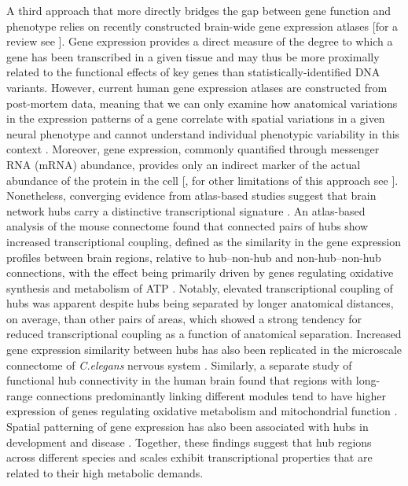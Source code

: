 A third approach that more directly bridges the gap between gene function and phenotype relies on recently constructed brain-wide gene expression atlases \citep{Hawrylycz2012} [for a review see \citep{Keil2018}]. Gene expression provides a direct measure of the degree to which a gene has been transcribed in a given tissue and may thus be more proximally related to the functional effects of key genes than statistically-identified DNA variants. However, current human gene expression atlases are constructed from post-mortem data, meaning that we can only examine how anatomical variations in the expression patterns of a gene correlate with spatial variations in a given neural phenotype and cannot understand individual phenotypic variability in this context \citep{Fornito2019}. Moreover, gene expression, commonly quantified through messenger RNA (mRNA) abundance, provides only an indirect marker of the actual abundance of the protein in the cell [\citep{Futcher1999,Greenbaum2003,Gygi1999}, for other limitations of this approach see \citep{Fornito2019}]. Nonetheless, converging evidence from atlas-based studies suggest that brain network hubs carry a distinctive transcriptional signature \citep{Arnatkeviciute2018,Fulcher2016,Rubinov2015c,Vertes2016b}. An atlas-based analysis of the mouse connectome found that connected pairs of hubs show increased transcriptional coupling, defined as the similarity in the gene expression profiles between brain regions, relative to hub--non-hub and non-hub--non-hub connections, with the effect being primarily driven by genes regulating oxidative synthesis and metabolism of ATP \citep{Fulcher2016}. Notably, elevated transcriptional coupling of hubs was apparent despite hubs being separated by longer anatomical distances, on average, than other pairs of areas, which showed a strong tendency for reduced transcriptional coupling as a function of anatomical separation. Increased gene expression similarity between hubs has also been replicated in the microscale connectome of \textit{C.elegans} nervous system \citep{Arnatkeviciute2018}. Similarly, a separate study of functional hub connectivity in the human brain found that regions with long-range connections predominantly linking different modules tend to have higher expression of genes regulating oxidative metabolism and mitochondrial function \citep{Vertes2016b}. Spatial patterning of gene expression has also been associated with hubs in development \citep{Whitaker2016a} and disease \citep{Rittman2016}. Together, these findings suggest that hub regions across different species and scales exhibit transcriptional properties that are related to their high metabolic demands.

